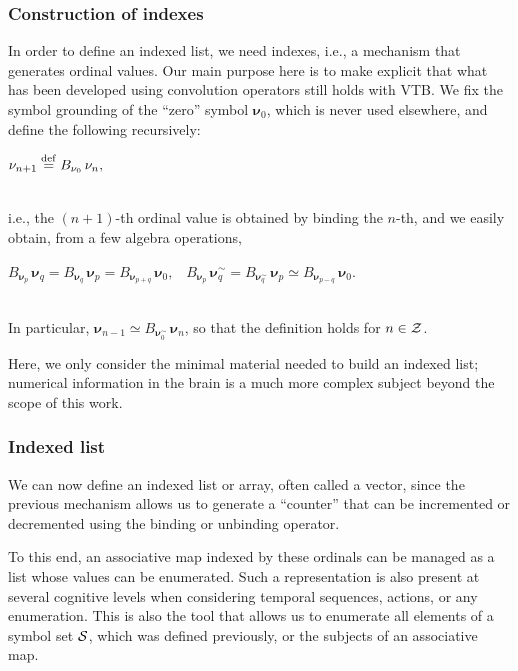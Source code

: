\documentclass[sn-mathphys]{sn-jnl}
\newcommand{\defq}{\stackrel {\rm def}{=}}
\newcommand{\eqline}[1]{~\vspace{0.1cm}\\\centerline{$#1$}\vspace{0.1cm}\\}
\begin{document}
\begin{appendices}
\subsubsection{Construction of indexes}

In order to define an indexed list, we need indexes, i.e., a mechanism that generates ordinal values. Our main purpose here is to make explicit that what has been developed using convolution operators \cite{komer_neural_2019} still holds with VTB. We fix the symbol grounding of the ``zero'' symbol $\mathbf{\nu}_0$, which is never used elsewhere, and define the following recursively:
\eqline{\mathbf{\nu}_{n + 1} \defq B_{\mathbf{\nu}_0} \, \mathbf{\nu}_n,}
i.e., the $(n+1)$-th ordinal value is obtained by binding the $n$-th, and we easily obtain, from a few algebra operations,
\eqline{B_{\mathbf{\nu}_p} \, \mathbf{\nu}_q = B_{\mathbf{\nu}_q} \, \mathbf{\nu}_p = B_{\mathbf{\nu}_{p+q}} \, \mathbf{\nu}_0, \;\;\; 
B_{\mathbf{\nu}_p} \, \mathbf{\nu}_q^\sim = B_{\mathbf{\nu}_q^\sim} \, \mathbf{\nu}_p  \simeq B_{\mathbf{\nu}_{p-q}} \, \mathbf{\nu}_0.}
In particular, $\mathbf{\nu}_{n - 1} \simeq B_{\mathbf{\nu}_0^\sim} \, \mathbf{\nu}_n$, so that the definition
holds for $n \in {\cal Z}$.

Here, we only consider the minimal material needed to build an indexed list; numerical information in the brain is a much more complex subject \cite{nieder_representation_2007} beyond the scope of this work.

\subsubsection{Indexed list} 
We can now define an indexed list or array, often called a vector, since the previous mechanism allows us to generate a ``counter'' that can be incremented or decremented using the binding or unbinding operator.

To this end, an associative map indexed by these ordinals can be managed as a list whose values can be enumerated. Such a representation is also present at several cognitive levels when considering temporal sequences, actions, or any enumeration. This is also the tool that allows us to enumerate all elements of a symbol set ${\cal S}$, which was defined previously, or the subjects of an associative map.


\end{appendices}
\end{document}

